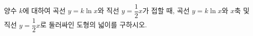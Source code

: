 양수 $k$에 대하여 곡선 $y=k\ln x$와 직선 $y=\dfrac{1}{2}x$가 접할 때, 곡선 $y=k\ln x$와 $x$축 및 직선 $y=\dfrac{1}{2}x$로 둘러싸인 도형의 넓이를 구하시오.

